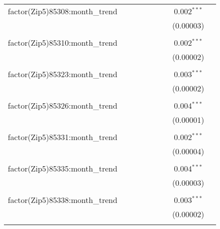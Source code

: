 \begin{table}[H]
{\begin{tabular}{@{\extracolsep{5pt}}lcccccccc}
  factor(Zip5)85308:month\_trend &  &  &  &  &  &  & 0.002$^{***}$ &  \\  

   &  &  &  &  &  &  & (0.00003) &  \\  

   & & & & & & & & \\  

  factor(Zip5)85310:month\_trend &  &  &  &  &  &  & 0.002$^{***}$ &  \\  

   &  &  &  &  &  &  & (0.00002) &  \\  

   & & & & & & & & \\  

  factor(Zip5)85323:month\_trend &  &  &  &  &  &  & 0.003$^{***}$ &  \\  

   &  &  &  &  &  &  & (0.00002) &  \\  

   & & & & & & & & \\  

  factor(Zip5)85326:month\_trend &  &  &  &  &  &  & 0.004$^{***}$ &  \\  

   &  &  &  &  &  &  & (0.00001) &  \\  

   & & & & & & & & \\  

  factor(Zip5)85331:month\_trend &  &  &  &  &  &  & 0.002$^{***}$ &  \\  

   &  &  &  &  &  &  & (0.00004) &  \\  

   & & & & & & & & \\  

  factor(Zip5)85335:month\_trend &  &  &  &  &  &  & 0.004$^{***}$ &  \\  

   &  &  &  &  &  &  & (0.00003) &  \\  

   & & & & & & & & \\  

  factor(Zip5)85338:month\_trend &  &  &  &  &  &  & 0.003$^{***}$ &  \\  

   &  &  &  &  &  &  & (0.00002) &  \\  

   & & & & & & & & \\  


\end{tabular}}
\end{table}
